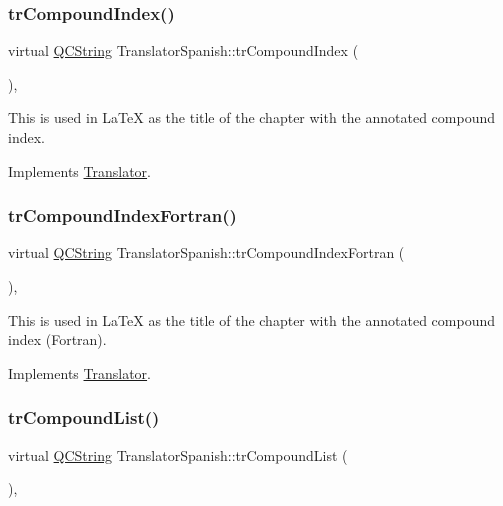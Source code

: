 \subsubsection{\texorpdfstring{trCompoundIndex()}{trCompoundIndex()}}
{\footnotesize\ttfamily virtual \mbox{\hyperlink{class_q_c_string}{Q\+C\+String}} Translator\+Spanish\+::tr\+Compound\+Index (\begin{DoxyParamCaption}{ }\end{DoxyParamCaption})\hspace{0.3cm}{\ttfamily [inline]}, {\ttfamily [virtual]}}

This is used in La\+TeX as the title of the chapter with the annotated compound index. 

Implements \mbox{\hyperlink{class_translator}{Translator}}.

\mbox{\label{class_translator_spanish_ab0b20d4d6601997960a865be8161baf3}} 
\subsubsection{\texorpdfstring{trCompoundIndexFortran()}{trCompoundIndexFortran()}}
{\footnotesize\ttfamily virtual \mbox{\hyperlink{class_q_c_string}{Q\+C\+String}} Translator\+Spanish\+::tr\+Compound\+Index\+Fortran (\begin{DoxyParamCaption}{ }\end{DoxyParamCaption})\hspace{0.3cm}{\ttfamily [inline]}, {\ttfamily [virtual]}}

This is used in La\+TeX as the title of the chapter with the annotated compound index (Fortran). 

Implements \mbox{\hyperlink{class_translator}{Translator}}.

\mbox{\label{class_translator_spanish_a245863c89ea98145d2e689592c980be5}} 
\subsubsection{\texorpdfstring{trCompoundList()}{trCompoundList()}}
{\footnotesize\ttfamily virtual \mbox{\hyperlink{class_q_c_string}{Q\+C\+String}} Translator\+Spanish\+::tr\+Compound\+List (\begin{DoxyParamCaption}{ }\end{DoxyParamCaption})\hspace{0.3cm}{\ttfamily [inline]}, {\ttfamily [virtual]}}

